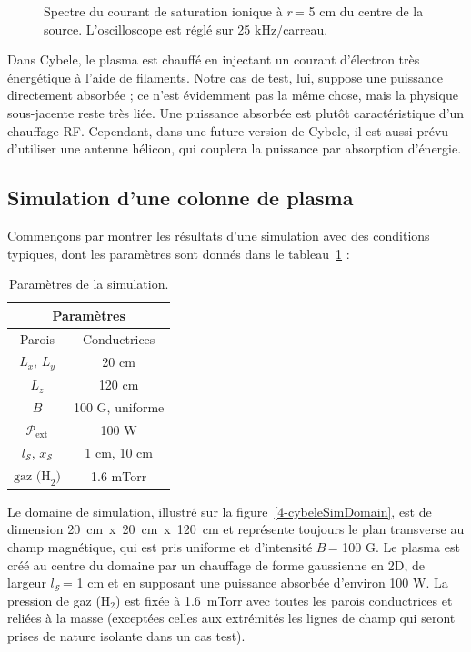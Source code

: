 \begin{refsection}
\begin{figure}[!htbp]
    \caption{Spectre du courant de saturation
    ionique à $r\,$= 5 cm du centre de la source.
    L'oscilloscope est réglé sur 25 kHz/carreau.\label{4-CybeleFourierSignal}}
\end{figure}

Dans Cybele, le plasma est chauffé en injectant un courant
d'électron très énergétique à l'aide de filaments. Notre cas de
test, lui, suppose une puissance directement absorbée ; ce n'est évidemment pas
la même chose, mais la physique sous-jacente reste très liée. Une puissance
absorbée est plutôt caractéristique d'un chauffage RF. Cependant, dans une future version de Cybele, il est aussi
prévu d'utiliser une antenne hélicon, qui couplera la puissance par absorption d'énergie.
 
\subsection{Simulation d'une colonne de plasma}

Commençons par montrer les résultats d'une simulation avec des conditions
typiques, dont les paramètres sont donnés dans le tableau~\ref{4-CybeleParam1} :

\begin{table}[!htbp]
\footnotesize\centering
{}
\begin{tabular}{cc}\toprule
\multicolumn{2}{c}{\bf Paramètres}\\
\midrule 
Parois & Conductrices\\
$L_x$, $L_y$ & 20 cm\\
$L_z$ & 120 cm\\
$B$&100 G, uniforme\\
$\mathcal{P}_\text{ext}$&100 W\\
$l_\mathcal{S}$, $x_\mathcal{S}$& 1 cm, 10 cm\\
$\text{gaz (H}_2\text{)}$ & 1.6 mTorr\\
\bottomrule
\end{tabular}
\caption{Paramètres de la simulation.}\label{4-CybeleParam1}
\end{table}

 Le domaine de
simulation, illustré sur la figure~\ref{4-cybeleSimDomain}, est de dimension
20~cm~x~20~cm~x~120~cm et représente toujours le plan transverse au champ
magnétique, qui est pris uniforme et d'intensité $B\,$= 100 G. Le plasma est créé au centre du domaine par un chauffage de forme gaussienne en 2D, de largeur $l_\mathcal{S}\,$= 1 cm et en supposant une puissance absorbée
d'environ 100 W.
La pression de gaz (H$_2$) est fixée à 1.6~mTorr avec toutes les parois
conductrices et reliées à la masse (exceptées celles aux extrémités les lignes
de champ qui seront prises de nature isolante dans un cas test).



\end{refsection}
